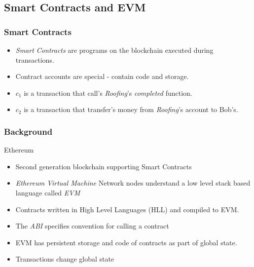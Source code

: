 \documentclass{beamer}
\begin{document}
\subsection{Smart Contracts and EVM}
\begin{frame}[fragile]
    \frametitle{Smart Contracts}
  \begin{figure}
    \centering
    \begin{tikzpicture}[shorten >=1pt,on grid, node distance=2.3cm, draw=black!80, auto]
      
    \end{tikzpicture}
  \end{figure}
  \begin{itemize}
    \item \textit{Smart Contracts} are programs on the blockchain executed
      during transactions.
    \item Contract accounts are special - contain code and storage.
    \item $\textit{c}_1$ is a transaction that call's \textit{Roofing}'s
      \textit{completed} function.
    \item $\textit{c}_2$ is a transaction that transfer's money from \textit{Roofing}'s
      account to Bob's.
  \end{itemize}
\end{frame}
\begin{frame}
  \frametitle{Background}
  \begin{block}{Ethereum}
    \begin{itemize}
      \item Second generation blockchain supporting Smart Contracts
      \item \textit{Ethereum Virtual Machine} Network nodes
        understand a low level stack based language called \textit{EVM}
      \item Contracts written in High Level Languages (HLL) and compiled to EVM.
      \item The \textit{ABI} specifies convention for calling a contract
      \item EVM has persistent storage and code of contracts as
        part of global state.
      \item Transactions change global state
    \end{itemize}
  \end{block}
\end{frame}
\end{document}
